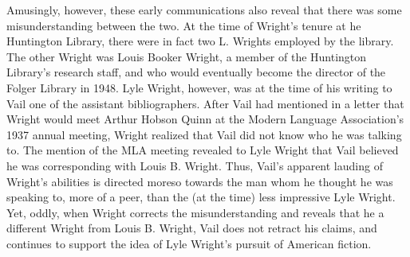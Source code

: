 Amusingly, however, these early communications also reveal that there was some misunderstanding between the two. At the time of Wright's tenure at he Huntington Library, there were in fact two L. Wrights employed by the library. The other Wright was Louis Booker Wright, a member of the Huntington Library's research staff, and who would eventually become the director of the Folger Library in 1948. Lyle Wright, however, was at the time of his writing to Vail one of the assistant bibliographers. After Vail had mentioned in a letter that Wright would meet Arthur Hobson Quinn at the Modern Language Association's 1937 annual meeting, Wright realized that Vail did not know who he was talking to.\autocite{lyle_h._wright_letter_1936-2} The mention of the MLA meeting revealed to Lyle Wright that Vail believed he was corresponding with Louis B. Wright. Thus, Vail's apparent lauding of Wright's abilities is directed moreso towards the man whom he thought he was speaking to, more of a peer, than the (at the time) less impressive Lyle Wright. Yet, oddly, when Wright corrects the misunderstanding and reveals that he a different Wright from Louis B. Wright, Vail does not retract his claims, and continues to support the idea of Lyle Wright's pursuit of American fiction. 

